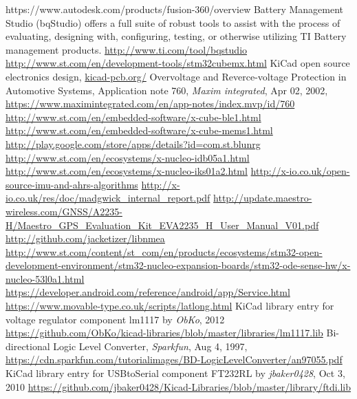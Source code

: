\begin{thebibliography}{9}
\label{sec:ref}

https://www.autodesk.com/products/fusion-360/overview
Battery Management Studio (bqStudio) offers a full suite of robust tools to assist with the process of evaluating, designing with, configuring, testing, or otherwise utilizing TI Battery management products. \url{http://www.ti.com/tool/bqstudio}
  \url{http://www.st.com/en/development-tools/stm32cubemx.html}
  KiCad open source electronics design,
  \url{kicad-pcb.org/}
	Overvoltage and Reverce-voltage Protection in Automotive Systems,
	Application note 760, \emph{Maxim integrated}, Apr 02, 2002, 
	\url{https://www.maximintegrated.com/en/app-notes/index.mvp/id/760}
  \url{http://www.st.com/en/embedded-software/x-cube-ble1.html}
  \url{http://www.st.com/en/embedded-software/x-cube-mems1.html}
  \url{http://play.google.com/store/apps/details?id=com.st.blunrg}
  \url{http://www.st.com/en/ecosystems/x-nucleo-idb05a1.html}
  \url{http://www.st.com/en/ecosystems/x-nucleo-iks01a2.html}
  \url{http://x-io.co.uk/open-source-imu-and-ahrs-algorithms}
  \url{http://x-io.co.uk/res/doc/madgwick_internal_report.pdf}
  \url{http://update.maestro-wireless.com/GNSS/A2235-H/Maestro_GPS_Evaluation_Kit_EVA2235_H_User_Manual_V01.pdf}
  \url{http://github.com/jacketizer/libnmea}
  \url{http://www.st.com/content/st_com/en/products/ecosystems/stm32-open-development-environment/stm32-nucleo-expansion-boards/stm32-ode-sense-hw/x-nucleo-53l0a1.html}
  \url{https://developer.android.com/reference/android/app/Service.html}
  \url{https://www.movable-type.co.uk/scripts/latlong.html}
	KiCad library entry for voltage regulator component lm1117 by \emph{ObKo}, 2012  
  \url{https://github.com/ObKo/kicad-libraries/blob/master/libraries/lm1117.lib}
	Bi-directional Logic Level Converter, \emph{Sparkfun}, Aug 4, 1997,
	\url{https://cdn.sparkfun.com/tutorialimages/BD-LogicLevelConverter/an97055.pdf}
	KiCad library entry for USBtoSerial component FT232RL by \emph{jbaker0428}, Oct 3, 2010
	\url{https://github.com/jbaker0428/Kicad-Libraries/blob/master/library/ftdi.lib}

\end{thebibliography}
